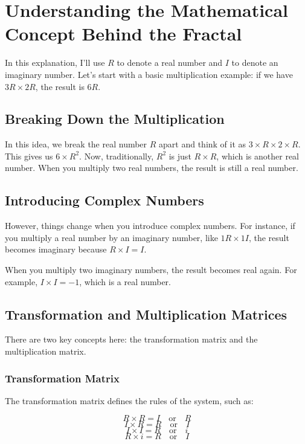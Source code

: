 \documentclass{article}
\begin{document}
\section*{Understanding the Mathematical Concept Behind the Fractal}

In this explanation, I'll use \( R \) to denote a real number and \( I \) to denote an imaginary number. Let's start with a basic multiplication example: if we have \( 3R \times 2R \), the result is \( 6R \).

\subsection*{Breaking Down the Multiplication}

In this idea, we break the real number \( R \) apart and think of it as \( 3 \times R \times 2 \times R \). This gives us \( 6 \times R^2 \). Now, traditionally, \( R^2 \) is just \( R \times R \), which is another real number. When you multiply two real numbers, the result is still a real number.

\subsection*{Introducing Complex Numbers}

However, things change when you introduce complex numbers. For instance, if you multiply a real number by an imaginary number, like \( 1R \times 1I \), the result becomes imaginary because \( R \times I = I \).

When you multiply two imaginary numbers, the result becomes real again. For example, \( I \times I = -1 \), which is a real number.

\subsection*{Transformation and Multiplication Matrices}

There are two key concepts here: the transformation matrix and the multiplication matrix.

\subsubsection*{Transformation Matrix}

The transformation matrix defines the rules of the system, such as:

\[
R \times R = I \quad \text{or} \quad R
\]
\[
I \times R = R \quad \text{or} \quad I
\]
\[
I \times I = R \quad \text{or} \quad i
\]
\[
R \times i = R \quad \text{or} \quad I
\]
\end{document}
